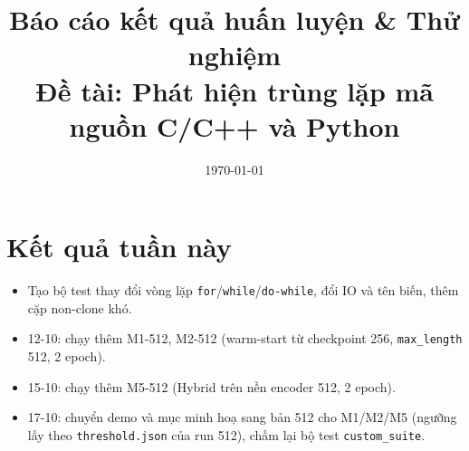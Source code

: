 \documentclass[11pt,a4paper]{article}
\title{\vspace{-1.0cm}\textbf{Báo cáo kết quả huấn luyện \& Thử nghiệm}\\[4pt]
       {\normalsize Đề tài: Phát hiện trùng lặp mã nguồn C/C++ và Python}}
\date{\today}
\begin{document}
\maketitle
\vspace{-0.8cm}
\section{Kết quả tuần này}
\begin{itemize}[leftmargin=*,itemsep=0pt,topsep=2pt,parsep=0pt]
\item Tạo bộ test thay đổi vòng lặp \texttt{for}/\texttt{while}/\texttt{do-while},
  đổi IO và tên biến, thêm cặp non-clone khó.
\item 12-10: chạy thêm M1-512, M2-512 (warm-start từ checkpoint 256, \texttt{max\_length} 512, 2 epoch).
\item 15-10: chạy thêm M5-512 (Hybrid trên nền encoder 512, 2 epoch).
\item 17-10: chuyển demo và mục minh hoạ sang bản 512 cho M1/M2/M5 (ngưỡng lấy theo
  \texttt{threshold.json} của run 512), chấm lại bộ test \texttt{custom\_suite}.
\end{itemize}
\end{document}
